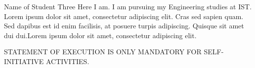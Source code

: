 \documentclass[a4paper,12pt,journal,twoside,compsoc]{PPIEEEtran}
\begin{document}
\begin{IEEEbiography}
{Name of Student Three}
Here I am. I am pursuing my Engineering studies at \ac{IST}. Lorem ipsum dolor sit amet, consectetur adipiscing elit. Cras sed sapien quam. Sed dapibus est id enim facilisis, at posuere turpis adipiscing. Quisque sit amet dui dui.Lorem ipsum dolor sit amet, consectetur adipiscing elit. 
\end{IEEEbiography}
\newpage
\onecolumn
STATEMENT OF EXECUTION IS ONLY MANDATORY FOR SELF-INITIATIVE ACTIVITIES.
\end{document}
